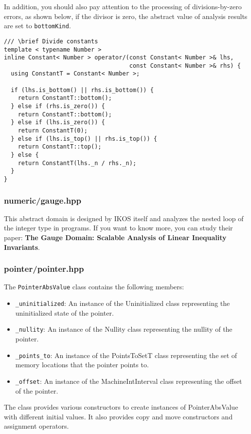 \documentclass[12pt]{article}
\begin{document}
In addition, you should also pay attention to the processing of divisions-by-zero errors, as shown below, if the divisor is zero, the abstract value of analysis results are set to \texttt{bottomKind}.
\begin{lstlisting}
/// \brief Divide constants
template < typename Number >
inline Constant< Number > operator/(const Constant< Number >& lhs,
                                    const Constant< Number >& rhs) {
  using ConstantT = Constant< Number >;

  if (lhs.is_bottom() || rhs.is_bottom()) {
    return ConstantT::bottom();
  } else if (rhs.is_zero()) {
    return ConstantT::bottom();
  } else if (lhs.is_zero()) {
    return ConstantT(0);
  } else if (lhs.is_top() || rhs.is_top()) {
    return ConstantT::top();
  } else {
    return ConstantT(lhs._n / rhs._n);
  }
}
\end{lstlisting}

\subsubsection{numeric/gauge.hpp}
This abstract domain is designed by IKOS itself and analyzes the nested loop of the integer type in programs. If you want to know more, you can study their paper: \textbf{The Gauge Domain: Scalable Analysis of Linear Inequality Invariants}.

\subsubsection{pointer/pointer.hpp}
The \texttt{PointerAbsValue} class contains the following members:

\begin{itemize}
  \item \texttt{\_uninitialized}: An instance of the Uninitialized class representing the uninitialized state of the pointer.
  \item \texttt{\_nullity}: An instance of the Nullity class representing the nullity of the pointer.
  \item \texttt{\_points\_to}: An instance of the PointsToSetT class representing the set of memory locations that the pointer points to.
  \item \texttt{\_offset}: An instance of the MachineIntInterval class representing the offset of the pointer.
\end{itemize}
The class provides various constructors to create instances of PointerAbsValue with different initial values. It also provides copy and move constructors and assignment operators.
\end{document}
